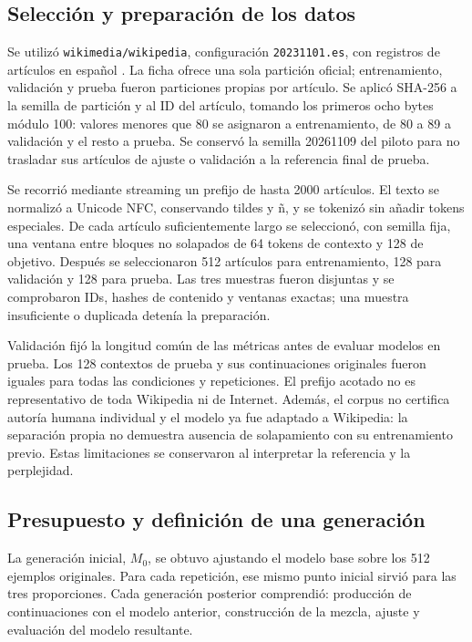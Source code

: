 \documentclass[12pt,letterpaper]{article}
\begin{document}
\subsection{Selección y preparación de los datos}

Se utilizó \texttt{wikimedia/wikipedia}, configuración
\texttt{20231101.es}, con registros de artículos en español
\cite{wikipediacard}. La ficha ofrece una sola partición oficial;
entrenamiento, validación y prueba fueron particiones propias por artículo.
Se aplicó SHA-256 a la semilla de partición y al ID del artículo, tomando
los primeros ocho bytes módulo 100: valores menores que 80 se asignaron
a entrenamiento, de 80 a 89 a validación y el resto a prueba. Se conservó
la semilla 20261109 del piloto para no trasladar sus artículos de ajuste
o validación a la referencia final de prueba.

Se recorrió mediante streaming un prefijo de hasta 2000 artículos. El texto
se normalizó a Unicode NFC, conservando tildes y ñ, y se tokenizó sin
añadir tokens especiales. De cada artículo suficientemente largo se
seleccionó, con semilla fija, una ventana entre bloques no solapados de
64 tokens de contexto y 128 de objetivo. Después se seleccionaron 512
artículos para entrenamiento, 128 para validación y 128 para prueba.
Las tres muestras fueron disjuntas y se comprobaron IDs, hashes de contenido
y ventanas exactas; una muestra insuficiente o duplicada detenía la preparación.

Validación fijó la longitud común de las métricas antes de evaluar modelos
en prueba. Los 128 contextos de prueba y sus continuaciones originales fueron
iguales para todas las condiciones y repeticiones. El prefijo acotado no es
representativo de toda Wikipedia ni de Internet. Además, el corpus no
certifica autoría humana individual y el modelo ya fue adaptado a Wikipedia:
la separación propia no demuestra ausencia de solapamiento con su entrenamiento
previo. Estas limitaciones se conservaron al interpretar la referencia y la
perplejidad.

\subsection{Presupuesto y definición de una generación}

La generación inicial, \(M_0\), se obtuvo ajustando el modelo base sobre
los 512 ejemplos originales. Para cada repetición, ese mismo punto inicial
sirvió para las tres proporciones. Cada generación posterior comprendió:
producción de continuaciones con el modelo anterior, construcción de la
mezcla, ajuste y evaluación del modelo resultante.
\end{document}
